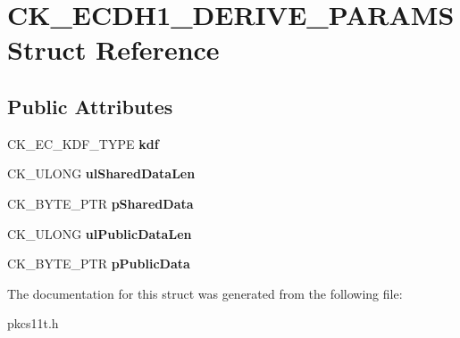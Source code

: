 \hypertarget{struct_c_k___e_c_d_h1___d_e_r_i_v_e___p_a_r_a_m_s}{}\section{C\+K\+\_\+\+E\+C\+D\+H1\+\_\+\+D\+E\+R\+I\+V\+E\+\_\+\+P\+A\+R\+A\+MS Struct Reference}
\label{struct_c_k___e_c_d_h1___d_e_r_i_v_e___p_a_r_a_m_s}
\subsection*{Public Attributes}
\begin{DoxyCompactItemize}
\item 
\mbox{\label{struct_c_k___e_c_d_h1___d_e_r_i_v_e___p_a_r_a_m_s_a41b07bdfaafe367160d98f436aab63d8}} 
C\+K\+\_\+\+E\+C\+\_\+\+K\+D\+F\+\_\+\+T\+Y\+PE {\bfseries kdf}
\item 
\mbox{\label{struct_c_k___e_c_d_h1___d_e_r_i_v_e___p_a_r_a_m_s_a02d6c1c7d1eef23185b8724d2747ed99}} 
C\+K\+\_\+\+U\+L\+O\+NG {\bfseries ul\+Shared\+Data\+Len}
\item 
\mbox{\label{struct_c_k___e_c_d_h1___d_e_r_i_v_e___p_a_r_a_m_s_add79222389080ea155a4ad9d36a3e772}} 
C\+K\+\_\+\+B\+Y\+T\+E\+\_\+\+P\+TR {\bfseries p\+Shared\+Data}
\item 
\mbox{\label{struct_c_k___e_c_d_h1___d_e_r_i_v_e___p_a_r_a_m_s_af06ac27a02189f096fd840e0e27e58c4}} 
C\+K\+\_\+\+U\+L\+O\+NG {\bfseries ul\+Public\+Data\+Len}
\item 
\mbox{\label{struct_c_k___e_c_d_h1___d_e_r_i_v_e___p_a_r_a_m_s_a73705855f1dceeed1af8180dd4f54ce0}} 
C\+K\+\_\+\+B\+Y\+T\+E\+\_\+\+P\+TR {\bfseries p\+Public\+Data}
\end{DoxyCompactItemize}


The documentation for this struct was generated from the following file\+:\begin{DoxyCompactItemize}
\item 
pkcs11t.\+h\end{DoxyCompactItemize}
